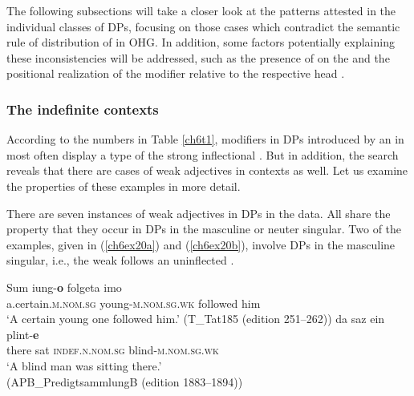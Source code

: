 \documentclass[output=paper,colorlinks,citecolor=brown]{langscibook}
\begin{document}
The following subsections will take a closer look at the patterns
attested in the individual classes of DPs, focusing on those cases which
contradict the semantic rule of distribution of  in
OHG. In addition, some factors potentially explaining these
inconsistencies will be addressed, such as the presence of  on
the  and the positional realization of the modifier relative
to the respective head .

\subsubsection{The indefinite contexts}\label{sec:indef}
According to the numbers in Table \ref{ch6t1}, modifiers in DPs introduced by an
in most often display a type of the strong
inflectional . But in addition, the  search reveals that
there are cases of weak adjectives in  contexts as well. Let
us examine the properties of these examples in more detail.

There are seven instances of weak adjectives in  DPs in the
data. All share the property that they occur in DPs in the masculine or neuter
singular. Two of the examples, given in (\ref{ch6ex20a}) and (\ref{ch6ex20b}), involve DPs in the masculine
 singular, i.e., the weak  follows an uninflected
.

\begin{exe}
\ex\label{ch6ex20}\begin{xlist}
\ex\label{ch6ex20a}
\gll Sum iung-\textbf{o} folgeta imo\\
 a.certain.\textsc{m.nom.sg} young-\textsc{m.nom.sg.wk} followed him\\
\glt `A certain young one followed him.' (T\_Tat185 (edition 251--262))
\ex\label{ch6ex20b} 
\gll da saz ein plint-\textbf{e}\\
there sat \textsc{indef.n.nom.sg} blind-\textsc{m.nom.sg.wk}\\
\glt `A blind man was sitting there.' \\ (APB\_PredigtsammlungB (edition 1883--1894))
\end{xlist}
\end{exe}
\end{document}
